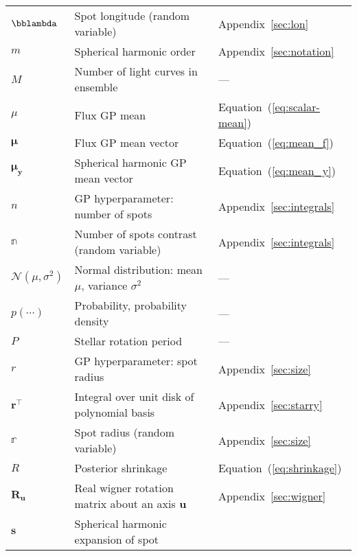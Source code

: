 \begin{center}
\begin{longtable}{W{c}{1cm} W{l}{9cm} W{l}{2cm}}
        $\bblambda$
         & Spot longitude (random variable)
         & Appendix~\ref{sec:lon}
        \\
        $m$
         & Spherical harmonic order
         & Appendix~\ref{sec:notation}
        \\
        $M$
         & Number of light curves in ensemble
         & ---
        \\
        $\mu$
         & Flux GP mean
         & Equation~(\ref{eq:scalar-mean})
        \\
        $\pmb{\mu}$
         & Flux GP mean vector
         & Equation~(\ref{eq:mean_f})
        \\
        $\pmb{\mu}_\mathbf{y}$
         & Spherical harmonic GP mean vector
         & Equation~(\ref{eq:mean_y})
        \\
        $n$
         & GP hyperparameter: number of spots
         & Appendix~\ref{sec:integrals}
        \\
        $\mathbb{n}$
         & Number of spots contrast (random variable)
         & Appendix~\ref{sec:integrals}
        \\
        $\mathcal{N}(\mu, \sigma^2)$
         & Normal distribution: mean $\mu$, variance $\sigma^2$
         & ---
        \\
        $p(\cdots)$
         & Probability, probability density
         & ---
        \\
        $P$
         & Stellar rotation period
         & ---
        \\
        $r$
         & GP hyperparameter: spot radius
         & Appendix~\ref{sec:size}
        \\
        $\mathbf{r}^\top$
         & Integral over unit disk of polynomial basis
         & Appendix~\ref{sec:starry}
        \\
        $\mathbb{r}$
         & Spot radius (random variable)
         & Appendix~\ref{sec:size}
        \\
        $R$
         & Posterior shrinkage
         & Equation~(\ref{eq:shrinkage})
        \\
        $\mathbf{R}_\mathbf{u}$
         & Real wigner rotation matrix about an axis $\mathbf{u}$
         & Appendix~\ref{sec:wigner}
        \\
        $\mathbf{s}$
         & Spherical harmonic expansion of spot

\end{longtable}
\end{center}
